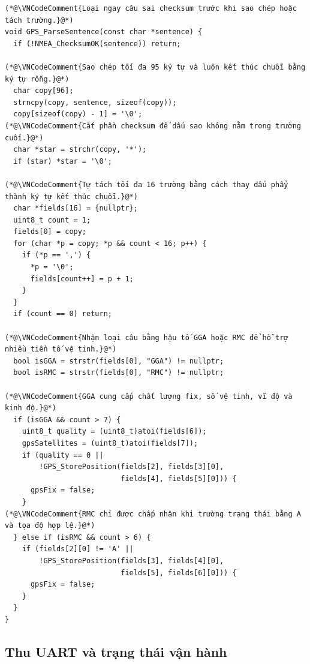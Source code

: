 \documentclass[12pt]{article}
\begin{document}
\begin{lstlisting}[style=firmware,caption={Parser NMEA tự viết cho câu GGA và RMC}]
(*@\VNCodeComment{Loại ngay câu sai checksum trước khi sao chép hoặc tách trường.}@*)
void GPS_ParseSentence(const char *sentence) {
  if (!NMEA_ChecksumOK(sentence)) return;

(*@\VNCodeComment{Sao chép tối đa 95 ký tự và luôn kết thúc chuỗi bằng ký tự rỗng.}@*)
  char copy[96];
  strncpy(copy, sentence, sizeof(copy));
  copy[sizeof(copy) - 1] = '\0';
(*@\VNCodeComment{Cắt phần checksum để dấu sao không nằm trong trường cuối.}@*)
  char *star = strchr(copy, '*');
  if (star) *star = '\0';

(*@\VNCodeComment{Tự tách tối đa 16 trường bằng cách thay dấu phẩy thành ký tự kết thúc chuỗi.}@*)
  char *fields[16] = {nullptr};
  uint8_t count = 1;
  fields[0] = copy;
  for (char *p = copy; *p && count < 16; p++) {
    if (*p == ',') {
      *p = '\0';
      fields[count++] = p + 1;
    }
  }
  if (count == 0) return;

(*@\VNCodeComment{Nhận loại câu bằng hậu tố GGA hoặc RMC để hỗ trợ nhiều tiền tố vệ tinh.}@*)
  bool isGGA = strstr(fields[0], "GGA") != nullptr;
  bool isRMC = strstr(fields[0], "RMC") != nullptr;

(*@\VNCodeComment{GGA cung cấp chất lượng fix, số vệ tinh, vĩ độ và kinh độ.}@*)
  if (isGGA && count > 7) {
    uint8_t quality = (uint8_t)atoi(fields[6]);
    gpsSatellites = (uint8_t)atoi(fields[7]);
    if (quality == 0 ||
        !GPS_StorePosition(fields[2], fields[3][0],
                           fields[4], fields[5][0])) {
      gpsFix = false;
    }
(*@\VNCodeComment{RMC chỉ được chấp nhận khi trường trạng thái bằng A và tọa độ hợp lệ.}@*)
  } else if (isRMC && count > 6) {
    if (fields[2][0] != 'A' ||
        !GPS_StorePosition(fields[3], fields[4][0],
                           fields[5], fields[6][0])) {
      gpsFix = false;
    }
  }
}
\end{lstlisting}

\subsection{Thu UART và trạng thái vận hành}
\end{document}
